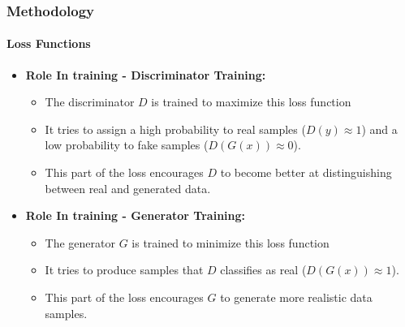 \documentclass[aspectratio=169, lecture, amberg]{OTHAWbeamer}
\begin{document}
\begin{frame}[t]
    \frametitle{Methodology}
    \framesubtitle{Loss Functions}
    \begin{itemize}
        \item <1-> \textbf{Role In training - Discriminator Training:}
        \begin{itemize}
            \item The discriminator \(D\) is trained to maximize this loss function
            \vspace{0.2cm}
            \item It tries to assign a high probability to real samples (\(D(y) \approx 1\)) and a low probability to fake samples (\(D(G(x)) \approx 0\)).
            \vspace{0.2cm}
            \item This part of the loss encourages \(D\) to become better at distinguishing between real and generated data.
 
        \end{itemize}
    \end{itemize}
    \begin{itemize}
        \item <2-> \textbf{Role In training - Generator Training:}
        \vspace{0.2cm}
        \begin{itemize}
             \item The generator \(G\) is trained to minimize this loss function
             \vspace{0.2cm}
             \item It tries to produce samples that \(D\) classifies as real (\(D(G(x)) \approx 1\)).
             \vspace{0.2cm}
             \item This part of the loss encourages \(G\) to generate more realistic data samples.
        \end{itemize}
    \end{itemize}
    
\end{frame}
\end{document}
